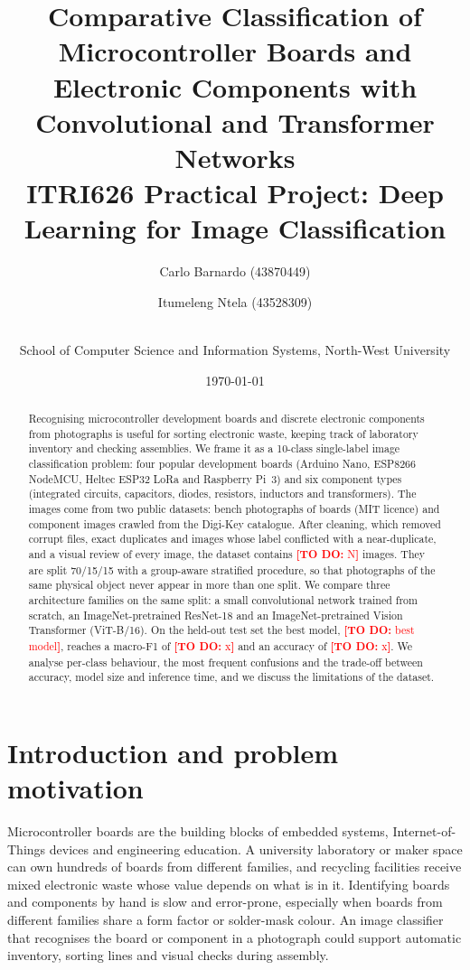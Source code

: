 \documentclass[11pt,a4paper]{article}
\title{\textbf{Comparative Classification of Microcontroller Boards and Electronic Components with Convolutional and Transformer Networks}\\[4pt]
\large ITRI626 Practical Project: Deep Learning for Image Classification}
\author{%
  Carlo Barnardo (43870449) \and
  Itumeleng Ntela (43528309) \and
  \fillin{Member 3 name (student number)}\\[6pt]
  \normalsize School of Computer Science and Information Systems, North-West University}
\date{\today}
\newcommand{\fillin}[1]{\textcolor{red}{\textbf{[TO DO:} #1\textbf{]}}}
\providecommand{\NumClasses}{10}
\providecommand{\NumImages}{\fillin{N}}
\providecommand{\BestModel}{\fillin{best model}}
\providecommand{\BestMacroF}{\fillin{x}}
\providecommand{\BestAcc}{\fillin{x}}
\begin{document}
\maketitle
{}

\begin{abstract}
Recognising microcontroller development boards and discrete electronic components from photographs is useful for sorting electronic waste, keeping track of laboratory inventory and checking assemblies. We frame it as a \NumClasses-class single-label image classification problem: four popular development boards (Arduino Nano, ESP8266 NodeMCU, Heltec ESP32 LoRa and Raspberry Pi~3) and six component types (integrated circuits, capacitors, diodes, resistors, inductors and transformers). The images come from two public datasets: bench photographs of boards (MIT licence) and component images crawled from the Digi-Key catalogue. After cleaning, which removed corrupt files, exact duplicates and images whose label conflicted with a near-duplicate, and a visual review of every image, the dataset contains \NumImages{} images. They are split 70/15/15 with a group-aware stratified procedure, so that photographs of the same physical object never appear in more than one split. We compare three architecture families on the same split: a small convolutional network trained from scratch, an ImageNet-pretrained ResNet-18 and an ImageNet-pretrained Vision Transformer (ViT-B/16). On the held-out test set the best model, \BestModel, reaches a macro-F1 of \BestMacroF{} and an accuracy of \BestAcc. We analyse per-class behaviour, the most frequent confusions and the trade-off between accuracy, model size and inference time, and we discuss the limitations of the dataset.
\end{abstract}

\section{Introduction and problem motivation}\label{sec:intro}
Microcontroller boards are the building blocks of embedded systems, Internet-of-Things devices and engineering education. A university laboratory or maker space can own hundreds of boards from different families, and recycling facilities receive mixed electronic waste whose value depends on what is in it. Identifying boards and components by hand is slow and error-prone, especially when boards from different families share a form factor or solder-mask colour. An image classifier that recognises the board or component in a photograph could support automatic inventory, sorting lines and visual checks during assembly.
\end{document}
